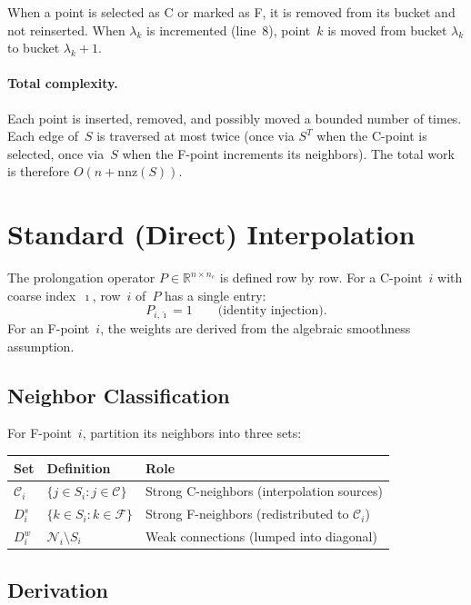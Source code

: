 \documentclass[11pt]{article}
\newcommand{\R}{\mathbb{R}}
\newcommand{\NN}{\mathcal{N}}
\newcommand{\CC}{\mathcal{C}}
\newcommand{\FF}{\mathcal{F}}
\begin{document}
When a point is selected as C or marked as F, it is removed from its
bucket and not reinserted.  When $\lambda_k$ is incremented (line~8),
point~$k$ is moved from bucket $\lambda_k$ to bucket $\lambda_k + 1$.

\paragraph{Total complexity.}
Each point is inserted, removed, and possibly moved a bounded number of
times.  Each edge of~$S$ is traversed at most twice (once via $S^T$ when
the C-point is selected, once via~$S$ when the F-point increments its
neighbors).  The total work is therefore
$O(n + \mathrm{nnz}(S))$.

\section{Standard (Direct) Interpolation}
\label{sec:interp}

The prolongation operator $P \in \R^{n \times n_c}$ is defined row by
row.  For a C-point~$i$ with coarse index~$\hat\imath$, row~$i$ of~$P$
has a single entry:
\[
  P_{i,\hat\imath} = 1 \qquad\text{(identity injection)}.
\]
For an F-point~$i$, the weights are derived from the algebraic
smoothness assumption.

\subsection{Neighbor Classification}

For F-point~$i$, partition its neighbors into three sets:
\begin{center}
\begin{tabular}{lll}
  \toprule
  Set & Definition & Role \\
  \midrule
  $\CC_i$ & $\{j \in S_i : j \in \CC\}$ &
    Strong C-neighbors (interpolation sources) \\
  $D_i^s$ & $\{k \in S_i : k \in \FF\}$ &
    Strong F-neighbors (redistributed to $\CC_i$) \\
  $D_i^w$ & $\NN_i \setminus S_i$ &
    Weak connections (lumped into diagonal) \\
  \bottomrule
\end{tabular}
\end{center}

\subsection{Derivation}
\end{document}
